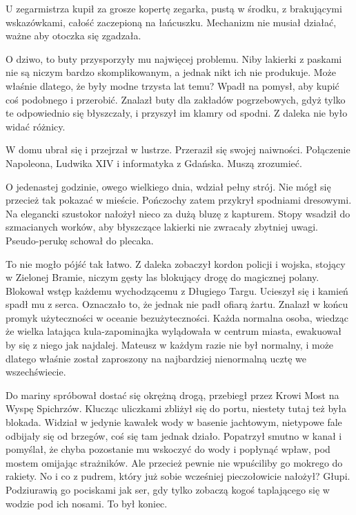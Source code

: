 U zegarmistrza kupił za grosze kopertę zegarka, pustą w środku, z brakującymi wskazówkami, całość zaczepioną na łańcuszku.
Mechanizm nie musiał działać, ważne aby otoczka się zgadzała.

O dziwo, to buty przysporzyły mu najwięcej problemu.
Niby lakierki z paskami nie są niczym bardzo skomplikowanym, a jednak nikt ich nie produkuje.
Może właśnie dlatego, że były modne trzysta lat temu?
Wpadł na pomysł, aby kupić coś podobnego i przerobić.
Znalazł buty dla zakładów pogrzebowych, gdyż tylko te odpowiednio się błyszczały, i przyszył im klamry od spodni.
Z daleka nie było widać różnicy.

W domu ubrał się i przejrzał w lustrze. Przeraził się swojej naiwności.
Połączenie Napoleona, Ludwika XIV i informatyka z Gdańska.
Muszą zrozumieć.

O jedenastej godzinie, owego wielkiego dnia, wdział pełny strój.
Nie mógł się przecież tak pokazać w mieście.
Pończochy zatem przykrył spodniami dresowymi.
Na elegancki szustokor nałożył nieco za dużą bluzę z kapturem.
Stopy wsadził do szmacianych worków, aby błyszczące lakierki nie zwracały zbytniej uwagi.
Pseudo-perukę schował do plecaka.

To nie mogło pójść tak łatwo.
Z daleka zobaczył kordon policji i wojska, stojący w Zielonej Bramie, niczym gęsty las blokujący drogę do magicznej polany.
Blokował wstęp każdemu wychodzącemu z Długiego Targu.
Ucieszył się i kamień spadł mu z serca. Oznaczało to, że jednak nie padł ofiarą żartu.
Znalazł w końcu promyk użyteczności w oceanie bezużyteczności. Każda normalna osoba, wiedząc że wielka latająca kula-zapominajka wylądowała w centrum miasta,
ewakuował by się z niego jak najdalej. 
Mateusz w każdym razie nie był normalny, i może dlatego właśnie został zaproszony na najbardziej nienormalną ucztę we wszechświecie.

Do mariny spróbował dostać się okrężną drogą, przebiegł przez Krowi Most na Wyspę Spichrzów.
Klucząc uliczkami zbliżył się do portu, niestety tutaj też była blokada.
Widział w jedynie kawałek wody w basenie jachtowym, nietypowe fale odbijały się od brzegów, coś się tam jednak działo.
Popatrzył smutno w kanał i pomyślał, że chyba pozostanie mu wskoczyć do wody i popłynąć wpław, pod mostem omijając strażników.
Ale przecież pewnie nie wpuściliby go mokrego do rakiety.
No i co z pudrem, który już sobie wcześniej pieczołowicie nałożył?
Głupi. Podziurawią go pociskami jak ser, gdy tylko zobaczą kogoś taplającego się w wodzie pod ich nosami.
To był koniec.

